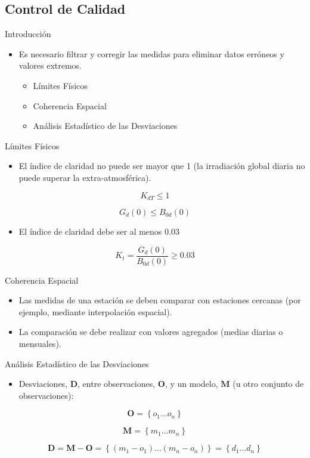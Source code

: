 \documentclass[xcolor={usenames,svgnames,dvipsnames}]{beamer}
\begin{document}
\subsection{Control de Calidad}
\label{sec:orge992522}
\begin{frame}[label={sec:org7cc2619}]{Introducción}
\begin{itemize}
\item Es necesario filtrar y corregir las medidas para eliminar datos erróneos y valores extremos.
\begin{itemize}
\item Límites Físicos
\item Coherencia Espacial
\item Análisis Estadístico de las Desviaciones
\end{itemize}
\end{itemize}
\end{frame}

\begin{frame}[label={sec:orge6ff8f0}]{Límites Físicos}
\begin{itemize}
\item El índice de claridad no puede ser mayor que 1 (la irradiación global diaria no puede superar la extra-atmosférica).
\end{itemize}
\[
  K_{dT} \leq 1
\]

\[
G_d(0) \leq B_{0d}(0)
\]

\begin{itemize}
\item El índice de claridad debe ser al menos 0.03
\end{itemize}
\[
K_t = \frac{G_d(0)}{B_{0d}(0)} \geq 0.03
\]
\end{frame}

\begin{frame}[label={sec:orgd8cf720}]{Coherencia Espacial}
\begin{itemize}
\item Las medidas de una estación se deben comparar con \alert{estaciones cercanas} (por ejemplo, mediante interpolación espacial).
\item La comparación se debe realizar con \alert{valores agregados} (medias diarias o mensuales).
\end{itemize}
\end{frame}

\begin{frame}[label={sec:org220e4f3}]{Análisis Estadístico de las Desviaciones}
\begin{itemize}
\item Desviaciones, \(\mathbf{D}\), entre observaciones, \(\mathbf{O}\), y un modelo, \(\mathbf{M}\) (u otro conjunto de observaciones):
\end{itemize}

\[
\mathbf{O} = \left\{ o_1 \dots o_n \right\}
\]

\[
\mathbf{M} = \left\{ m_1 \dots m_n  \right\}
\]

\[
\mathbf{D} = \mathbf{M} - \mathbf{O} =  \left\{ (m_1 - o_1) \dots (m_n - o_n)  \right\} = \left\{ d_1 \dots d_n  \right\}
\]
\end{frame}
\end{document}
